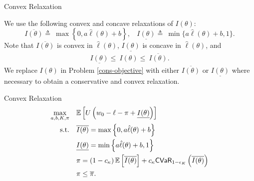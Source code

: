\documentclass{beamer}
\begin{document}
\begin{frame}{Convex Relaxation}

    We use the following convex and concave relaxations of $I(\theta)$: 
    \[
    \overline{I(\theta)} \triangleq\ \max \left \{ 0,a\hat{\ell}(\theta) + b\right \},\ \ \ \ 
    \underline{I(\theta)} \triangleq\ \min \{ a\hat{\ell}(\theta) + b,1 \}.
    \]
    Note that $\overline{I(\theta)}$ is convex in $\hat{\ell}(\theta)$, $\underline{I(\theta)}$ is concave in $\hat{\ell}(\theta)$, and
    \begin{align*}
    \underline{I(\theta)} \leq\ I(\theta) \leq\ \overline{I(\theta)}.
    \end{align*}
 We replace $I(\theta)$ in Problem \eqref{cons-objective} with either $\overline{I(\theta)}$ or $\underline{I(\theta)}$ where necessary to obtain a conservative and convex relaxation. 
\end{frame}

\begin{frame}{Convex Relaxation}
    \begin{align}
        \max_{a,b,K,\pi} &\quad \mathbb{E} \left [  U\left(w_0 - \ell - \pi  +  \underline{I(\theta)} \right) \right ]\label{eq-06}\\
        \text{s.t.} & \quad \overline{I(\theta)} = \max \left \{0,a\hat{\ell}(\theta) + b \right \} \nonumber\\
        & \quad \underline{I(\theta)} = \min \left \{a\hat{\ell}(\theta)+b,1 \right \} \nonumber\\
        & \quad \pi = \left (1-c_{\kappa} \right ) \mathbb{E} \left [ \overline{I(\theta)} \right ] + c_{\kappa} {\sf CVaR}_{1-\epsilon_K} \left( \overline{I(\theta)} \right) \label{eq-41}\\
        & \quad \pi \leq \overline{\pi} \nonumber.
  \end{align}
    
\end{frame}
\end{document}

